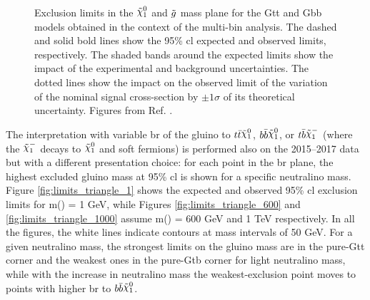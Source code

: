 \begin{figure}[htbp]
	\centering 
	\caption{Exclusion limits in the $\ninoone$ and $\tilde{g}$ mass plane
  		for the  Gtt and   Gbb models obtained
		in the context of the multi-bin analysis. The dashed and solid bold lines
		show the 95\% \gls{cl} expected and observed limits, respectively. The
  		shaded bands around the expected limits show the
                impact of the
  		experimental and background uncertainties. The dotted
  		lines show the impact on the observed limit of the variation of the
  		nominal signal cross-section by $\pm 1 \sigma$ of its theoretical
  		uncertainty. 
  		Figures from Ref. \cite{ATLAS-CONF-2018-041}.	
      }
	\label{fig:limits_GbbGtt_R21}
\end{figure}

The interpretation with variable \gls{br} of the gluino to $ t \bar{t} \ninoone$, $ b \bar{b} \ninoone$, 
or $t \bar{b} \chinoonem$ (where the $\chinoonem$ decays to $\ninoone$ and soft fermions) 
is performed also on the 2015--2017 data but with a different 
presentation choice: for each point in the \gls{br} plane, the highest excluded gluino mass at 95\% \gls{cl}
is shown for a specific neutralino mass. 
Figure \ref{fig:limits_triangle_1} shows the expected and observed 95\%
\gls{cl} exclusion limits for m(\ninoone) = 1 GeV, while Figures \ref{fig:limits_triangle_600} and \ref{fig:limits_triangle_1000} assume 
m(\ninoone) = 600 GeV and 1 TeV respectively. 
In all the figures, the white lines indicate contours at mass intervals of 50 GeV. 
For a given neutralino mass, the strongest limits on the gluino mass are in the pure-Gtt corner and the weakest ones in the 
pure-Gtb corner for light neutralino mass, while with the increase in neutralino mass the weakest-exclusion point 
moves to points with higher \gls{br} to $ b \bar{b} \ninoone$.



